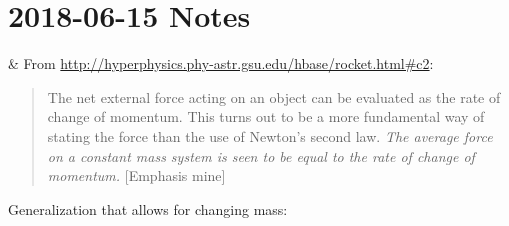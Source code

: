 \documentclass[12pt]{article}
\begin{document}
\section*{2018-06-15 Notes}

\begin{notetaking}

    & From \url{http://hyperphysics.phy-astr.gsu.edu/hbase/rocket.html#c2}:
\begin{quote}
The net external force acting on an object can be evaluated as the rate of change of momentum. This turns out to be a more fundamental way of stating the force than the use of Newton's second law.
\emph{The average force on a constant mass system is seen to be equal to the rate of change of momentum.} [Emphasis mine]
\end{quote}
Generalization that allows for changing mass:


\end{notetaking}
\end{document}
